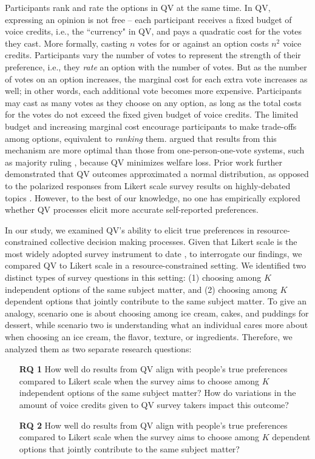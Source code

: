 Participants rank and rate the options in QV at the same time. In QV, expressing an opinion is not free -- each participant receives a fixed budget of voice credits, i.e., the ``currency" in QV, and pays a quadratic cost for the votes they cast. More formally, casting $n$ votes for or against an option costs $n^2$ voice credits. Participants vary the number of votes to represent the strength of their preference, i.e., they \textit{rate} an option with the number of votes. But as the number of votes on an option increases, the marginal cost for each extra vote increases as well; in other words, each additional vote becomes more expensive. Participants may cast as many votes as they choose on any option, as long as the total costs for the votes do not exceed the fixed given budget of voice credits. The limited budget and increasing marginal cost encourage participants to make trade-offs among options, equivalent to \textit{ranking} them. \textcite{posner2018radical} argued that results from this mechanism are more optimal than those from one-person-one-vote systems, such as majority ruling \cite{sep-voting-methods},  because QV minimizes welfare loss. Prior work further demonstrated that QV outcomes approximated a normal distribution, as opposed to the polarized responses from Likert scale survey results on highly-debated topics \cite{quarfoot2017quadratic}. However, to the best of our knowledge, no one has empirically explored whether QV processes elicit more accurate self-reported preferences.

In our study, we examined QV's ability to elicit true preferences in resource-constrained collective decision making processes. Given that Likert scale is the most widely adopted survey instrument to date \cite{moors2016two}, to interrogate our findings, we compared QV to Likert scale \cite{likert1932technique} in a resource-constrained setting. We identified two distinct types of survey questions in this setting: (1) choosing among $K$ independent options of the same subject matter, and (2) choosing among $K$ dependent options that jointly contribute to the same subject matter. To give an analogy, scenario one is about choosing among ice cream, cakes, and puddings for dessert, while scenario two is understanding what an individual cares more about when choosing an ice cream, the flavor, texture, or ingredients. Therefore, we analyzed them as two separate research questions:


\begin{itemize}[leftmargin=0.6in]
    \item[\textbf{RQ 1}] How well do results from QV align with people's true preferences compared to Likert scale when the survey aims to choose among $K$ independent options of the same subject matter? How do variations in the amount of voice credits given to QV survey takers impact this outcome?

    \item[\textbf{RQ 2}] How well do results from QV align with people's true preferences compared to Likert scale when the survey aims to choose among $K$ dependent options that jointly contribute to the same subject matter? 
\end{itemize}

